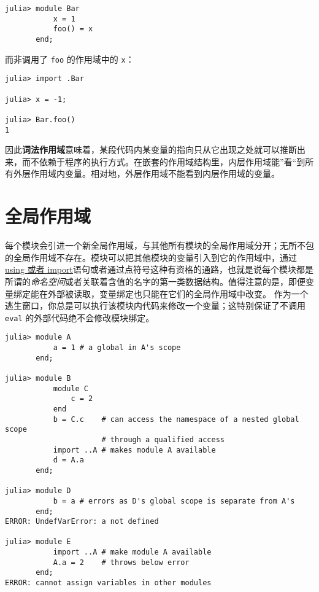 \begin{verbatim}
julia> module Bar
           x = 1
           foo() = x
       end;
\end{verbatim}



而非调用了 \texttt{foo} 的作用域中的 \texttt{x}：




\begin{verbatim}
julia> import .Bar

julia> x = -1;

julia> Bar.foo()
1
\end{verbatim}



因此\textbf{词法作用域}意味着，某段代码内某变量的指向只从它出现之处就可以推断出来，而不依赖于程序的执行方式。在嵌套的作用域结构里，内层作用域能”看“到所有外层作用域内变量。相对地，外层作用域不能看到内层作用域的变量。



\hypertarget{4662569705122519760}{}


\section{全局作用域}



每个模块会引进一个新全局作用域，与其他所有模块的全局作用域分开；无所不包的全局作用域不存在。模块可以把其他模块的变量引入到它的作用域中，通过\hyperlink{16725527896995457152}{using 或者 import}语句或者通过点符号这种有资格的通路，也就是说每个模块都是所谓的\emph{命名空间}或者关联着含值的名字的第一类数据结构。值得注意的是，即便变量绑定能在外部被读取，变量绑定也只能在它们的全局作用域中改变。 作为一个逃生窗口，你总是可以执行该模块内代码来修改一个变量；这特别保证了不调用 \texttt{eval} 的外部代码绝不会修改模块绑定。




\begin{verbatim}
julia> module A
           a = 1 # a global in A's scope
       end;

julia> module B
           module C
               c = 2
           end
           b = C.c    # can access the namespace of a nested global scope
                      # through a qualified access
           import ..A # makes module A available
           d = A.a
       end;

julia> module D
           b = a # errors as D's global scope is separate from A's
       end;
ERROR: UndefVarError: a not defined

julia> module E
           import ..A # make module A available
           A.a = 2    # throws below error
       end;
ERROR: cannot assign variables in other modules
\end{verbatim}



